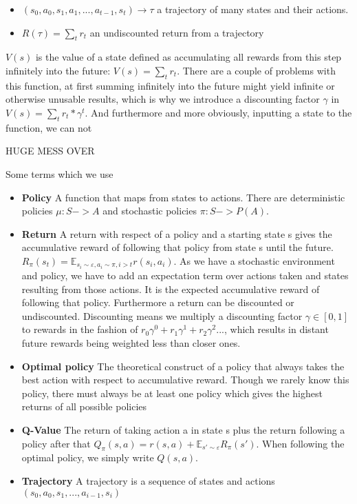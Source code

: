 \documentclass[hyperref,german,beleg]{cgvpub}
\begin{document}
\begin{itemize}
  \item \((s_0, a_0, s_1, a_1, ... , a_{t-1}, s_t) \rightarrow \tau\) a trajectory of many states and their actions.
  \item \(R(\tau) = \sum_t{r_t} \) an undiscounted return from a trajectory
\end{itemize}


\(V(s)\) is the value of a state defined as accumulating all rewards from this step infinitely into the future: \(V(s) = \sum_t{r_t}\). There are a couple of problems with this function, at first summing infinitely into the future might yield infinite or otherwise unusable results, which is why we introduce a discounting factor \(\gamma\) in \(V(s) = \sum_t{r_t * \gamma^t}\). And furthermore and more obviously, inputting a state to the function, we can not

HUGE MESS OVER

Some terms which we use
\begin{itemize}
  \item \textbf{Policy} A function that maps from states to actions. There are deterministic policies $\mu: S -> A$ and stochastic policies $\pi: S -> P(A)$.
  \item \textbf{Return} A return with respect of a policy and a starting state s gives the accumulative reward of following that policy from state s until the future. $R_{\pi}(s_t) = \mathbb{E}_{s_i \sim \varepsilon, a_i \sim \pi, i>t} r(s_i, a_i) $. As we have a stochastic environment and policy, we have to add an expectation term over actions taken and states resulting from those actions. It is the expected accumulative reward of following that policy. Furthermore a return can be discounted or undiscounted. Discounting means we multiply a discounting factor $\gamma \in [0,1]$ to rewards in the fashion of $r_0 \gamma^0 + r_1 \gamma^1 + r_2 \gamma^2 ...$, which results in distant future rewards being weighted less than closer ones.
  \item \textbf{Optimal policy} The theoretical construct of a policy that always takes the best action with respect to accumulative reward. Though we rarely know this policy, there must always be at least one policy which gives the highest returns of all possible policies
  \item \textbf{Q-Value} The return of taking action a in state s plus the return following a policy after that $Q_{\pi}(s,a) = r(s, a) + \mathbb{E}_{s' \sim \varepsilon} R_{\pi}(s')$. When following the optimal policy, we simply write $Q(s,a)$.
  \item \textbf{Trajectory} A trajectory is a sequence of states and actions $(s_0, a_0, s_1, ..., a_{i-1}, s_i)$
\end{itemize}
\end{document}
